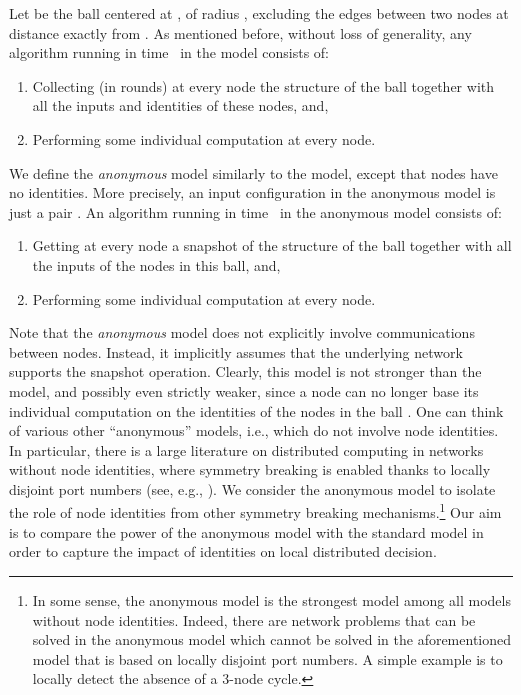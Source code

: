 \documentclass{llncs}
\begin{document}
Let  be the ball centered at , of radius , excluding the edges between two nodes at distance exactly  from . As mentioned before, without loss of generality, any algorithm running in time~ in the  model consists of:
\begin{enumerate}
\item  Collecting (in  rounds) at every node  the structure of the ball   together with all the inputs  and identities  of these nodes, and,
\item Performing some individual computation at every node. 
\end{enumerate}
We define the \emph{anonymous}   model similarly to the  model, except that nodes have no identities. More precisely, an input configuration in the anonymous  model is just a pair . An algorithm running in time~ in the anonymous  model consists of:
\begin{enumerate}
\item Getting at every node  a snapshot of the structure of the ball  together with all the inputs of the nodes in this ball, and,
\item Performing some individual computation at every node. 
\end{enumerate}
Note that the \emph{anonymous}  model does not explicitly involve communications between nodes. Instead, it implicitly assumes that the underlying network supports the snapshot operation.
Clearly, this model is not stronger than the   model, and possibly even strictly weaker, since a node  can no longer base its individual computation on the identities of the nodes in the ball . One can think of various other ``anonymous'' models, i.e., which do not involve node identities. In particular, there is a large literature on distributed computing in networks without node identities, where symmetry breaking is enabled thanks to locally disjoint port numbers (see, e.g., \cite{FP11}). We consider the anonymous  model to isolate the role of node identities from other symmetry breaking mechanisms.\footnote{In some sense, the anonymous  model is the strongest model among all models without node identities. Indeed, there are network problems that can be solved in the  anonymous  model  which cannot be solved in the aforementioned model that is based on locally disjoint port numbers. A simple example is to locally detect the absence of a 3-node cycle.} Our aim is to compare the power of the anonymous  model with the standard  model in order to capture the impact of identities on local distributed decision. 
\end{document}
